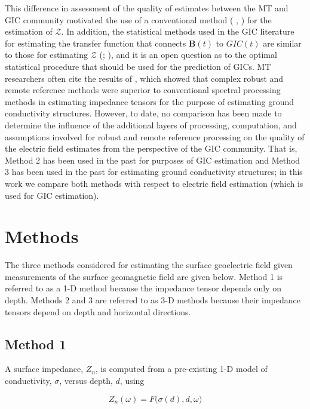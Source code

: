 \documentclass[linenumbers,draft]{agujournal}
\newcommand{\citeay}[1]{%
\citeauthor{#1}, \citeyear{#1}%
}
\begin{document}
This difference in assessment of the quality of estimates between the MT and GIC community motivated the use of a conventional method (\citeay{Sims1971}) for the estimation of $\mathcal{Z}$.  In addition, the statistical methods used in the GIC literature for estimating the transfer function that connects $\mathbf{B}(t)$ to $GIC(t)$ are similar to those for estimating $\mathcal{Z}$ (\cite{McKay2003}; \cite{Pulkkinen2007}), and it is an open question as to the optimal statistical procedure that should be used for the prediction of GICs.  MT researchers often cite the results of \cite{Jones1989}, which showed that complex robust and remote reference methods were superior to conventional spectral processing methods in estimating impedance tensors for the purpose of estimating ground conductivity structures.  However, to date, no comparison has been made to determine the influence of the additional layers of processing, computation, and assumptions involved for robust and remote reference processing on the quality of the electric field estimates from the perspective of the GIC community.  That is, Method 2 has been used in the past for purposes of GIC estimation and Method 3 has been used in the past for estimating ground conductivity structures; in this work we compare both methods with respect to electric field estimation (which is used for GIC estimation).

\section{Methods}

The three methods considered for estimating the surface geoelectric field given measurements of the surface geomagnetic field are given below.  Method 1 is referred to as a 1-D method because the impedance tensor depends only on depth.  Methods 2 and 3 are referred to as 3-D methods because their impedance tensors depend on depth and horizontal directions.

\subsection{Method 1}

A surface impedance, $Z_n$, is computed from a pre-existing 1-D model of conductivity, $\sigma$, versus depth, $d$, using

\begin{equation}
Z_{n}(\omega) = F\big(\sigma(d),d,\omega\big)
\end{equation}
\end{document}
